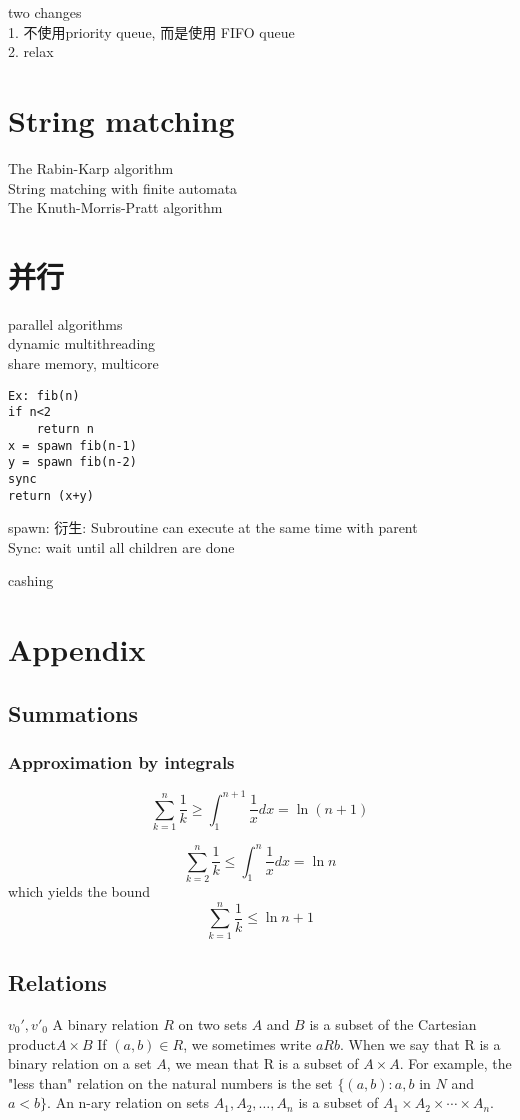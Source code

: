 \documentclass{article}
\begin{document}
two changes\\
1. 不使用priority queue, 而是使用 FIFO queue\\
2. relax

\section{String matching}
The Rabin-Karp algorithm\\
String matching with finite automata\\
The Knuth-Morris-Pratt algorithm

\section{并行}
\noindent
parallel algorithms\\
dynamic multithreading\\
share memory, multicore
\begin{verbatim}
Ex: fib(n)
if n<2
    return n
x = spawn fib(n-1)
y = spawn fib(n-2)
sync
return (x+y)
\end{verbatim}
spawn: 衍生: Subroutine can execute at the same time with parent\\
Sync: wait until all children are done

\noindent
cashing
\section{Appendix}
\subsection{Summations}
\subsubsection{Approximation by integrals}
$$
\sum_{k=1}^n \frac{ 1}{k} \geq \int_1^{n+1}\frac{1}{x}dx = \ln(n+1)
$$

$$
\sum_{k=2}^n \frac{ 1}{k} \leq \int_1^{n}\frac{1}{x}dx = \ln n
$$
which yields the bound
$$
\sum_{k=1}^n \frac{ 1}{k} \leq \ln n + 1
$$

\subsection{Relations}
$v_0',v'_0$
A binary relation $R$ on two sets $A$ and $B$ is a subset of the Cartesian product$A \times B$
If $(a, b) \in R$, we sometimes write $a R b$. When we say that R is a binary relation on a set $A$, we mean that R is a subset of $A \times A$. For example, the "less than" relation on the natural numbers is the set $\{(a, b) : a, b$ in $N$ and $a < b\}$. An n-ary relation on sets $A_1, A_2,\ldots, A_n$ is a subset of $A_1 \times A_2 \times \cdots \times  A_n$.
\end{document}
